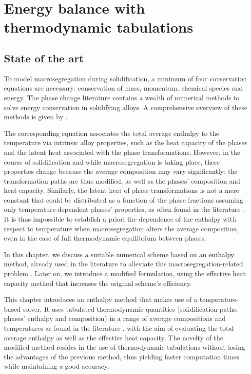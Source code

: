 \chapter{Energy balance with thermodynamic tabulations}
\begin{nolinkcolors} 
\minitoc
\end{nolinkcolors}
\newpage
%
%
\section{State of the art}
To model macrosegregation during solidification, a minimum of four conservation equations are necessary:
conservation  of  mass, momentum,  chemical  species and  energy. The  phase  change
literature  contains a  wealth of numerical methods to solve energy conservation
in solidifying alloys. A comprehensive overview of these methods is given by \citet{swaminathan_enthalpy_1993}.

The corresponding equation associates the total average enthalpy to the
temperature  via  intrinsic  alloy  properties, such  as the heat  capacity of  the
phases and the latent  heat associated with the phase transformations. However, in the course
of solidification and while macrosegregation is taking place, these  properties change because the average
composition may  vary  significantly: the  transformation paths are thus modified, as well as
the phases' composition and heat capacity. Similarly, the latent heat of phase  transformations
is not a mere constant that could be distributed as a function of the phase fractions
assuming only temperature-dependent phases' properties, as often found in the literature \citep{bellet_call_2009}.
It is thus impossible to establish a priori the dependence of the enthalpy with respect
to temperature when macrosegregation alters the average composition, even in the case of full thermodynamic equilibrium
between phases. 

In this chapter, we discuss a suitable numerical scheme based on an enthalpy method,
already used in the literature  to  alleviate this macrosegregation-related problem \citep{swaminathan_enthalpy_1993,
carozzani_direct_2013}. Later on, we introduce a modified formulation, using the effective heat capacity method that 
increases the original scheme's efficiency. 

This chapter introduces an enthalpy method that makes use of a temperature-based solver. 
It uses tabulated thermodynamic quantities (solidification paths, phases' enthalpy  and composition) 
in a range of average compositions and temperatures as found in the literature 
\citep{dore_modelling_2000,thuinet_prediction_2004,du_modeling_2007}, 
with the aim of evaluating the total average enthalpy as well as the effective heat capacity. 
The novelty of the modified method resides in the use of thermodynamic tabulations without losing 
the advantages of the previous method, thus yielding faster computation times while maintaining a 
good accuracy.


